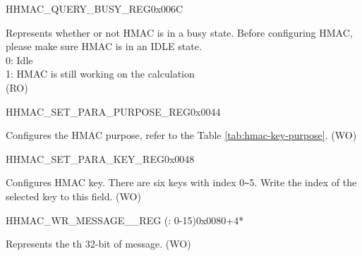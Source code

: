 \begin{register}{H}{HMAC\_QUERY\_BUSY\_REG}{0x006C}\label{regdesc:HMACQUERYBUSYREG}
%
%
\regnewline%
\begin{regdesc}\begin{reglist}
\label{fielddesc:HMACBUSYSTATE}\item [HMAC\_BUSY\_STATE] Represents whether or not HMAC is in a busy state. Before configuring HMAC, please make sure HMAC is in an IDLE state.
\\0: Idle
\\1: HMAC is still working on the calculation
\\(RO)
\end{reglist}\end{regdesc}
\end{register}


\begin{register}{H}{HMAC\_SET\_PARA\_PURPOSE\_REG}{0x0044}\label{regdesc:HMACSETPARAPURPOSEREG}
%
%
\regnewline%
\begin{regdesc}\begin{reglist}
\label{fielddesc:HMACPURPOSESET}\item [HMAC\_PURPOSE\_SET] Configures the HMAC purpose, refer to the Table \ref{tab:hmac-key-purpose}. (WO)
\end{reglist}\end{regdesc}
\end{register}


\begin{register}{H}{HMAC\_SET\_PARA\_KEY\_REG}{0x0048}\label{regdesc:HMACSETPARAKEYREG}
%
%
\regnewline%
\begin{regdesc}\begin{reglist}
\label{fielddesc:HMACKEYSET}\item [HMAC\_KEY\_SET] Configures HMAC key. There are six keys with index 0\verb+~+5. Write the index of the selected key to this field. (WO)
\end{reglist}\end{regdesc}
\end{register}


\begin{register}{H}{HMAC\_WR\_MESSAGE\_\_REG (: 0-15)}{0x0080+4*}\label{regdesc:HMACWRMESSAGENREG}
%
\regnewline%
\begin{regdesc}\begin{reglist}
\label{fielddesc:HMACWDATAN}\item [HMAC\_WDATA\_\regindex{n}] Represents the th 32-bit of message. (WO)
\end{reglist}\end{regdesc}
\end{register}


